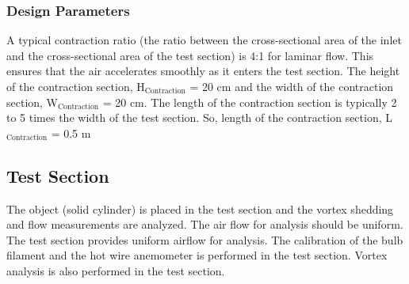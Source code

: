 


\subsubsection{Design Parameters}
A typical contraction ratio (the ratio between the cross-sectional area of the inlet and the cross-sectional area of the test section) is 4:1 for laminar flow. This ensures that the air accelerates smoothly as it enters the test section. The height of the contraction section, H$_{\text{Contraction}}$ = 20 cm and the width of the contraction section, W$_{\text{Contraction}}$ = 20 cm. The length of the contraction section is typically 2 to 5 times the width of the test section. So, length of the contraction section, L$_{\text{Contraction}}$ = 0.5 m 

\subsection{Test Section}
The object (solid cylinder) is placed in the test section and the vortex shedding and flow measurements are analyzed. The air flow for analysis should be uniform. The test section provides uniform airflow for analysis. The calibration of the bulb filament and the hot wire anemometer is performed in the test section. Vortex analysis is also performed in the test section.

